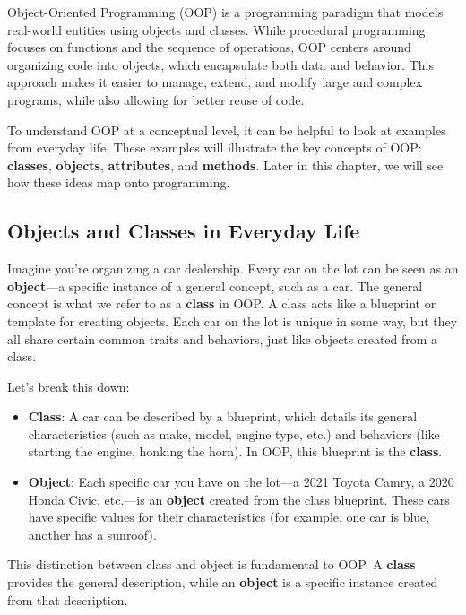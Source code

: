 \documentclass[
  letterpaper,
  DIV=11,
  numbers=noendperiod]{scrreprt}
\providecommand{\tightlist}{%
  \setlength{\itemsep}{0pt}\setlength{\parskip}{0pt}}\usepackage{longtable,booktabs,array}
\begin{document}
Object-Oriented Programming (OOP) is a programming paradigm that models
real-world entities using objects and classes. While procedural
programming focuses on functions and the sequence of operations, OOP
centers around organizing code into objects, which encapsulate both data
and behavior. This approach makes it easier to manage, extend, and
modify large and complex programs, while also allowing for better reuse
of code.

To understand OOP at a conceptual level, it can be helpful to look at
examples from everyday life. These examples will illustrate the key
concepts of OOP: \textbf{classes}, \textbf{objects},
\textbf{attributes}, and \textbf{methods}. Later in this chapter, we
will see how these ideas map onto programming.

\hypertarget{objects-and-classes-in-everyday-life}{%
\subsection{Objects and Classes in Everyday
Life}\label{objects-and-classes-in-everyday-life}}

Imagine you're organizing a car dealership. Every car on the lot can be
seen as an \textbf{object}---a specific instance of a general concept,
such as a car. The general concept is what we refer to as a
\textbf{class} in OOP. A class acts like a blueprint or template for
creating objects. Each car on the lot is unique in some way, but they
all share certain common traits and behaviors, just like objects created
from a class.

Let's break this down:

\begin{itemize}
\tightlist
\item
  \textbf{Class}: A car can be described by a blueprint, which details
  its general characteristics (such as make, model, engine type, etc.)
  and behaviors (like starting the engine, honking the horn). In OOP,
  this blueprint is the \textbf{class}.
\item
  \textbf{Object}: Each specific car you have on the lot---a 2021 Toyota
  Camry, a 2020 Honda Civic, etc.---is an \textbf{object} created from
  the class blueprint. These cars have specific values for their
  characteristics (for example, one car is blue, another has a sunroof).
\end{itemize}

This distinction between class and object is fundamental to OOP. A
\textbf{class} provides the general description, while an
\textbf{object} is a specific instance created from that description.
\end{document}
